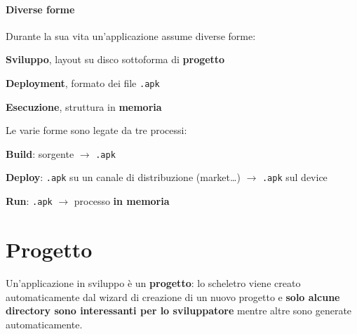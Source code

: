 \documentclass[10pt]{book}
\begin{document}
\paragraph{Diverse forme} Durante la sua vita un'applicazione assume diverse forme:
\begin{list}{}{}
	\item \textbf{Sviluppo}, layout su disco sottoforma di \textbf{progetto}
	\item \textbf{Deployment}, formato dei file \texttt{.apk}
	\item \textbf{Esecuzione}, struttura in \textbf{memoria}
\end{list}
Le varie forme sono legate da tre processi:
\begin{list}{}{}
	\item \textbf{Build}: sorgente $\rightarrow$ \texttt{.apk}
	\item \textbf{Deploy}: \texttt{.apk} su un canale di distribuzione (market\ldots) $\rightarrow$ \texttt{.apk} sul device
	\item \textbf{Run}: \texttt{.apk} $\rightarrow$ processo \textbf{in memoria}
\end{list}
\section{Progetto}
Un'applicazione in sviluppo è un \textbf{progetto}: lo scheletro viene creato automaticamente dal wizard di creazione di un nuovo progetto e \textbf{solo alcune directory sono interessanti per lo sviluppatore} mentre altre sono generate automaticamente.
\end{document}
